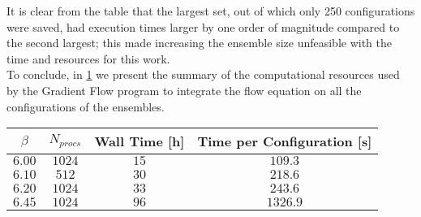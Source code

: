 It is clear from the table that the largest set, out of which only 250 configurations were saved, had execution times larger by one order of magnitude compared to the second largest; this made increasing the ensemble size unfeasible with the time and resources for this work.\\
To conclude, in \cref{runs:times_flow} we present the summary of the computational resources used by the Gradient Flow program to integrate the flow equation on all the configurations of the ensembles.

\begin{table}[!htb]
    \begin{center}
    \begin{tabular}{cccc}
        $\beta$ & $N_{procs}$ & Wall Time [h] & Time per Configuration [s]\\\hline
        $6.00$ & $1024$ & $15$ & $109.3$\\
        $6.10$ & $512$ & $30$ & $218.6$\\
        $6.20$ & $1024$ & $33$ & $243.6$ \\
        $6.45$ & $1024$ & $96$ & $1326.9$
    \end{tabular}
    \label{runs:times_flow} 
    \end{center}
\end{table}